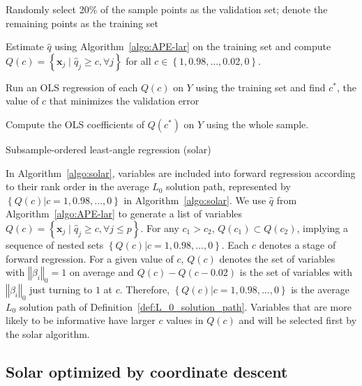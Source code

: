 \documentclass[11pt,review,authoryear]{elsarticle}
\begin{document}
\begin{algorithm}[ht]


  \smallskip
  Randomly select 20\% of the sample points as the validation set; denote the remaining points as the training set\;

  Estimate $\widehat{q}$ using Algorithm~\ref{algo:APE-lar} on the training set and compute $Q(c) = \left\{ \mathbf{x}_j \; \vert \; \widehat{q}_j \geqslant c, \forall j\right\}$ for all $c \in \left\{ 1, 0.98, \ldots, 0.02, 0 \right\}.$

  Run an OLS regression of each $Q(c)$ on $Y$ using the training set and find $c^*$, the value of $c$ that minimizes the validation error\;

  Compute the OLS coefficients of $Q(c^*)$ on $Y$ using the whole sample.

  \caption{Subsample-ordered least-angle regression (solar) \label{algo:solar}}
\end{algorithm}


In Algorithm~\ref{algo:solar}, variables are included into forward regression according to their rank order in the average $L_0$ solution path, represented by $\left\{ Q(c) \vert c = 1, 0.98, \ldots, 0\right\}$ in Algorithm~\ref{algo:solar}. We use $\widehat{q}$ from Algorithm~\ref{algo:APE-lar} to generate a list of variables $Q \left( c \right) = \left\{ \mathbf{x}_j \; \vert \; \widehat{q}_j \geqslant c, \forall j \leqslant p \right\}$. For any $c_1 > c_2$, $Q\left(c_1\right) \subset Q\left(c_2\right)$, implying a sequence of nested sets $\left\{ Q(c) \vert c = 1, 0.98, \ldots, 0\right\}$. Each $c$ denotes a stage of forward regression. For a given value of $c$, $Q(c)$ denotes the set of variables with $\left\Vert \beta_i \right\Vert_0=1$ on average and $Q(c) - Q(c - 0.02)$ is the set of variables with $\left\Vert \beta_i \right\Vert_0$ just turning to $1$ at $c$. Therefore, $\left\{ Q(c) \vert c = 1, 0.98, \ldots, 0\right\}$ is the average $L_0$ solution path of Definition~\ref{def:L_0_solution_path}. Variables that are more likely to be informative have larger $c$ values in $Q(c)$ and will be selected first by the solar algorithm.

\subsection{Solar optimized by coordinate descent}
\end{document}
